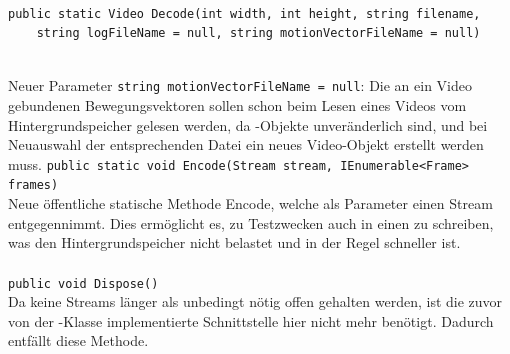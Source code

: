 \paragraph{}
\begin{itemize}
	\add \begin{verbatim}public static Video Decode(int width, int height, string filename,
    string logFileName = null, string motionVectorFileName = null)\end{verbatim} \\
	Neuer Parameter \verb!string motionVectorFileName = null!: Die an ein Video gebundenen Bewegungsvektoren sollen schon beim Lesen eines Videos vom Hintergrundspeicher gelesen werden, da -Objekte unveränderlich sind, und bei Neuauswahl der entsprechenden Datei ein neues Video-Objekt erstellt werden muss.
	\add \verb!public static void Encode(Stream stream, IEnumerable<Frame> frames)! \\
	Neue öffentliche statische Methode Encode, welche als Parameter einen Stream entgegennimmt. Dies ermöglicht es, zu Testzwecken auch in einen  zu schreiben, was den Hintergrundspeicher nicht belastet und in der Regel schneller ist.
\end{itemize}

\paragraph{}
\begin{itemize}
	\remove \verb!public void Dispose()! \\
	Da keine Streams länger als unbedingt nötig offen gehalten werden, ist die zuvor von der -Klasse implementierte Schnittstelle  hier nicht mehr benötigt. Dadurch entfällt diese Methode.
\end{itemize}
\newpage

\subsection{}

